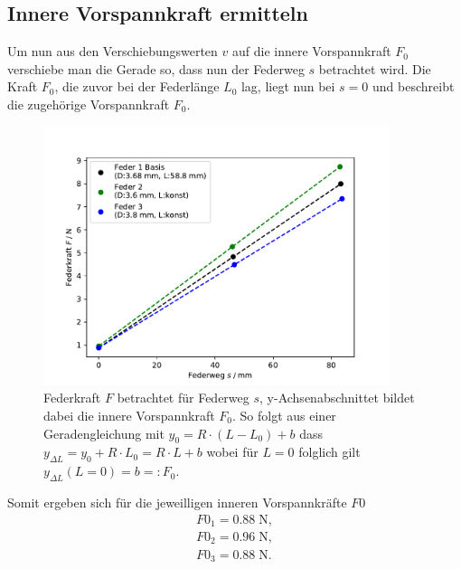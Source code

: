 \subsection{Innere Vorspannkraft ermitteln}
\label{sec:vorspannkraft}
Um nun aus den Verschiebungswerten $v$ auf die innere Vorspannkraft $F_0$ verschiebe
man die Gerade so, dass nun der Federweg $s$ betrachtet wird.
Die Kraft $F_0$, die zuvor bei der Federlänge $L_0$ lag, liegt nun bei $s=0$
und beschreibt die zugehörige Vorspannkraft $F_0$.
\begin{figure}[H]
  \center
  \includegraphics[width=0.9\textwidth]{plots/f0_123_dia.pdf}
  \caption
  {
    Federkraft $F$ betrachtet für Federweg $s$, y-Achsenabschnittet bildet dabei die innere Vorspannkraft $F_0$.
    So folgt aus einer Geradengleichung mit $y_0=R\cdot(L-L_0)+b$ dass $y_{\Delta L}=y_0+R \cdot L_0=R \cdot L+b$
    wobei für $L=0$ folglich gilt $y_{\Delta L}(L=0)=b=:F_0$.
  }
\end{figure}
Somit ergeben sich für die jeweilligen inneren Vorspannkräfte $F0$
\begin{align*}
  F0_1=  0.88 \;\si{\N},\\
  F0_2=  0.96 \;\si{\N},\\
  F0_3=  0.88 \;\si{\N}.\\
\end{align*}



